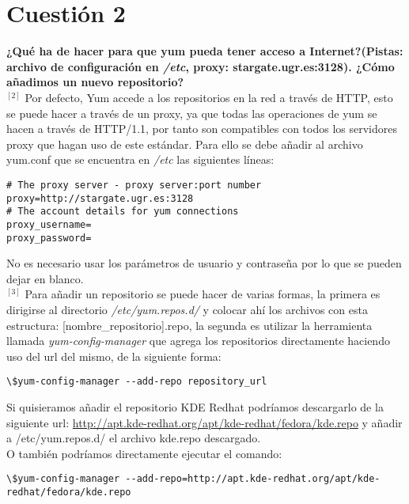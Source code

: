 \documentclass[a4paper, 11pt]{article} %
\begin{document}
\pagebreak

\section{Cuestión 2}
\textbf{¿Qué ha de hacer para que yum pueda tener acceso a Internet?(Pistas: archivo de configuración en \textit{/etc}, proxy: stargate.ugr.es:3128). ¿Cómo añadimos un nuevo repositorio?}\\

$^{[2]}$ Por defecto, Yum accede a los repositorios en la red a través de HTTP, esto se puede hacer a través de un proxy, ya que todas las operaciones de yum se hacen a través de HTTP/1.1, por tanto son compatibles con todos los servidores proxy que hagan uso de este estándar. Para ello se debe añadir al archivo yum.conf que se encuentra en \textit{/etc} las siguientes líneas:

\begin{verbatim}
# The proxy server - proxy server:port number 
proxy=http://stargate.ugr.es:3128 
# The account details for yum connections 
proxy_username=
proxy_password=
\end{verbatim}
No es necesario usar los parámetros de usuario y contraseña por lo que se pueden dejar en blanco.\\
$^{[3]}$ Para añadir un repositorio se puede hacer de varias formas, la primera es dirigirse al directorio \textit{/etc/yum.repos.d/} y colocar ahí los archivos con esta estructura: [nombre\_repositorio].repo, la segunda es utilizar  la herramienta llamada \textit{yum-config-manager} que agrega los repositorios directamente haciendo uso del url del mismo, de la siguiente forma:
\begin{verbatim}
\$yum-config-manager --add-repo repository_url
\end{verbatim}

Si quisieramos añadir el repositorio KDE Redhat podríamos descargarlo de la siguiente url: \url{http://apt.kde-redhat.org/apt/kde-redhat/fedora/kde.repo} y añadir a /etc/yum.repos.d/ el archivo kde.repo descargado.\\
O también podríamos directamente ejecutar el comando:
\begin{verbatim}
\$yum-config-manager --add-repo=http://apt.kde-redhat.org/apt/kde-redhat/fedora/kde.repo
\end{verbatim}

\pagebreak
\end{document}

